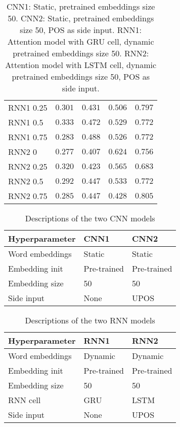 \begin{table}
\begin{tabular}{lrrrr}
    RNN1 0.25 & $0.301$ & $0.431$ & $0.506$ & $0.797$ \\
    RNN1 0.5 & $0.333$ & $0.472$ & $0.529$ & $0.772$ \\
    RNN1 0.75 & $0.283$ & $\mathbf{0.488}$ & $0.526$ & $0.772$ \\
    \midrule
    RNN2 0 & $0.277$ & $0.407$ & $\mathbf{0.624}$ & $0.756$ \\
    RNN2 0.25 & $0.320$ & $0.423$ & $0.565$ & $0.683$ \\
    RNN2 0.5 & $0.292$ & $0.447$ & $0.533$ & $0.772$ \\
    RNN2 0.75 & $0.285$ & $0.447$ & $0.428$ & $\mathbf{0.805}$ \\
    \bottomrule
  \end{tabular}
  \caption{CNN1: Static, pretrained embeddings size 50.
           CNN2: Static, pretrained embeddings size 50, POS as side input.
           RNN1: Attention model with GRU cell, dynamic pretrained
           embeddings size 50.
           RNN2: Attention model with LSTM cell, dynamic pretrained
           embeddings size 50, POS as side input.}
  \label{tab:multitask-results}
\end{table}

\begin{table}
  \centering
  \begin{tabular}{lll}
    \toprule
    Hyperparameter & CNN1 & CNN2 \\
    \midrule
    Word embeddings & Static & Static \\
    Embedding init & Pre-trained & Pre-trained \\
    Embedding size & 50 & 50 \\
    Side input & None & UPOS \\
    \bottomrule
  \end{tabular}
  \caption{Descriptions of the two CNN models}
  \label{tab:cnn-parameters}
\end{table}

\begin{table}
  \centering
  \begin{tabular}{lll}
    \toprule
    Hyperparameter & RNN1 & RNN2 \\
    \midrule
    Word embeddings & Dynamic & Dynamic \\
    Embedding init & Pre-trained & Pre-trained \\
    Embedding size & 50 & 50 \\
    RNN cell & GRU & LSTM \\
    Side input & None & UPOS \\
    \bottomrule
  \end{tabular}
  \caption{Descriptions of the two RNN models}
  \label{tab:rnn-parameters}
\end{table}

